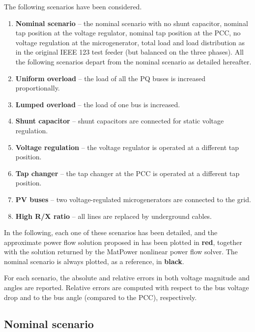 \documentclass[10pt,letterpaper]{article}
\begin{document}
The following scenarios have been considered. 
\begin{enumerate}
\item \textbf{Nominal scenario} -- the nominal scenario with no shunt capacitor, nominal tap position at the voltage regulator, nominal tap position at the PCC, no voltage regulation at the microgenerator, total load and load distribution as in the original IEEE 123 test feeder (but balanced on the three phases). All the following scenarios depart from the nominal scenario as detailed hereafter.
\item \textbf{Uniform overload} -- the load of all the PQ buses is increased proportionally.
\item \textbf{Lumped overload} -- the load of one bus is increased.
\item \textbf{Shunt capacitor} -- shunt capacitors are connected for static voltage regulation.
\item \textbf{Voltage regulation} -- the voltage regulator is operated at a different tap position.
\item \textbf{Tap changer} -- the tap changer at the PCC is operated at a different tap position.
\item \textbf{PV buses} -- two voltage-regulated microgenerators are connected to the grid.
\item \textbf{High R/X ratio} -- all lines are replaced by underground cables.
\end{enumerate}

In the following, each one of these scenarios has been detailed, and the approximate power flow solution proposed in \cite{Bolognani_powerflow} has been plotted in \textbf{\color{red}red}, together with the solution returned by the MatPower nonlinear power flow solver. The nominal scenario is always plotted, as a reference, in \textbf{black}.

For each scenario, the absolute and relative errors in both voltage magnitude and angles are reported.
Relative errors are computed with respect to the bus voltage drop and to the bus angle (compared to the PCC), respectively.


\subsection{Nominal scenario}
\end{document}
